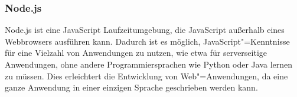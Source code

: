 \subsubsection{Node.js}

Node.js ist eine JavaScript Laufzeitumgebung, die JavaScript außerhalb eines Webbrowsers ausführen kann.
Dadurch ist es möglich, JavaScript"=Kenntnisse für eine Vielzahl von Anwendungen zu nutzen, wie etwa für serverseitige Anwendungen,
ohne andere Programmiersprachen wie Python oder Java lernen zu müssen.
Dies erleichtert die Entwicklung von Web"=Anwendungen, da eine ganze Anwendung in einer einzigen Sprache geschrieben werden kann.
\cite{intro:nodejs}
